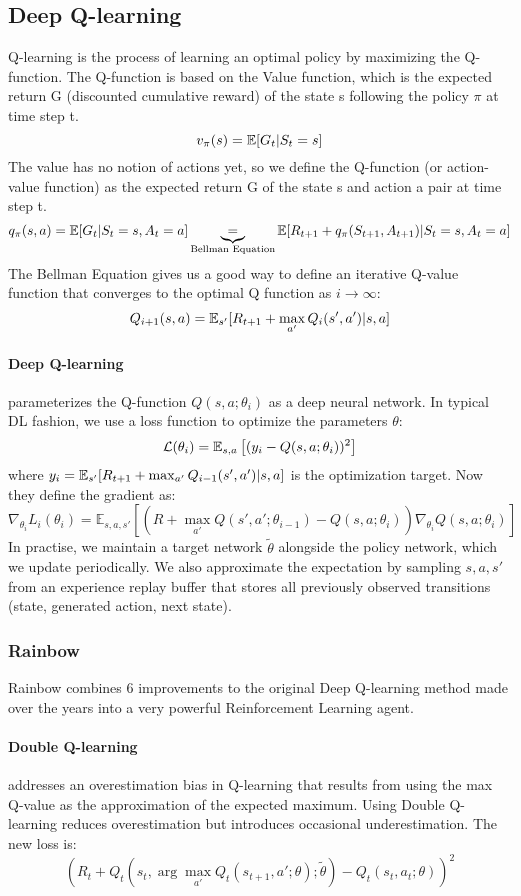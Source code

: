 \subsection{Deep Q-learning}
Q-learning is the process of learning an optimal policy by maximizing the Q-function.
The Q-function is based on the Value function, which is the expected return G (discounted cumulative reward) of the state s following the policy $\pi$ at time step t.
$$v_\pi(s) = \mathbb{E}[G_t| S_t=s]$$
The value has no notion of actions yet, so we define the Q-function (or action-value function) as the expected return G of the state s and action a pair at time step t.
$$q_\pi(s,a) = \mathbb{E}[G_t|S_t=s, A_t = a] \underbrace{=}_{\text{Bellman Equation}} \mathbb{E}[R_{t+1} + q_\pi(S_{t+1}, A_{t+1})|S_t=s, A_t = a]$$
The Bellman Equation gives us a good way to define an iterative Q-value function that converges to the optimal Q function as $i\rightarrow \infty$:
$$Q_{i+1}(s,a) = \mathbb{E}_{s'}[R_{t+1} + \max_{a'} Q_{i}(s', a')|s,a]$$
\paragraph{Deep Q-learning} \cite{deep-q} parameterizes the Q-function $Q(s,a;\theta_i)$ as a deep neural network. In typical DL fashion, we use a loss function to optimize the parameters $\theta$:
$$\mathcal{L}(\theta_i) = \mathbb{E}_{s,a}\left[(y_i - Q(s,a;\theta_i))^2\right]$$ where 
$y_i = \mathbb{E}_{s'}[R_{t+1} + \max_{a'} Q_{i-1}(s', a')|s,a]$ is the optimization target. 
Now they define the gradient as:
$$\nabla_{\theta_i} L_i (\theta_i) = 
\mathbb{E}_{s, a, s'} 
\left[ \left( R + \max_{a'} Q(s', a'; \theta_{i-1}) - Q(s, a; \theta_i) \right) 
\nabla_{\theta_i} Q(s, a; \theta_i) \right]$$
In practise, we maintain a target network $\tilde\theta$ alongside the policy network, which we update periodically.
We also approximate the expectation by sampling $s,a,s'$ from an experience replay buffer that stores all previously observed transitions (state, generated action, next state).

\subsubsection{Rainbow}
Rainbow \cite{Rainbow} combines 6 improvements to the original Deep Q-learning method made over the years into a very powerful Reinforcement Learning agent.\\
\paragraph{Double Q-learning} \cite{doubleQ} addresses an overestimation bias in Q-learning that results from using the max Q-value as the approximation of the expected maximum.
Using Double Q-learning reduces overestimation but introduces occasional underestimation.
The new loss is:
$$(R_t + Q_t(s_t, \arg\max_{a'}Q_t(s_{t+1},a';\theta);\tilde\theta)  - Q_t(s_t,a_t;\theta))^2 $$
